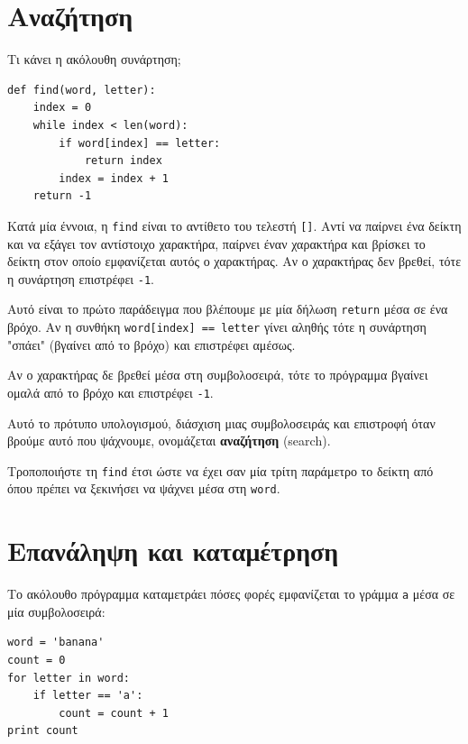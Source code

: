 \documentclass[10pt]{book}
\begin{document}
\section{Αναζήτηση}
\label{find}

Τι κάνει η ακόλουθη συνάρτηση;

\begin{verbatim}
def find(word, letter):
    index = 0
    while index < len(word):
        if word[index] == letter:
            return index
        index = index + 1
    return -1
\end{verbatim}
%

Κατά μία έννοια, η {\tt find} είναι το αντίθετο του τελεστή {\tt []}. 
Αντί να παίρνει ένα δείκτη και να εξάγει τον αντίστοιχο χαρακτήρα, παίρνει έναν χαρακτήρα και βρίσκει το δείκτη στον οποίο εμφανίζεται αυτός ο χαρακτήρας. Αν ο χαρακτήρας δεν βρεθεί, τότε η συνάρτηση επιστρέφει {\tt -1}.

Αυτό είναι το πρώτο παράδειγμα που βλέπουμε με μία δήλωση {\tt return} μέσα σε ένα βρόχο. Αν η συνθήκη {\tt word[index] == letter} γίνει αληθής τότε η συνάρτηση "σπάει" (βγαίνει από το βρόχο) και επιστρέφει αμέσως.

Αν ο χαρακτήρας δε βρεθεί μέσα στη συμβολοσειρά, τότε το πρόγραμμα βγαίνει ομαλά από το βρόχο και επιστρέφει {\tt -1}.

Αυτό το πρότυπο υπολογισμού, διάσχιση μιας συμβολοσειράς και επιστροφή όταν βρούμε αυτό που ψάχνουμε, ονομάζεται {\bf αναζήτηση} (search).
\\

\begin{exercise}

Τροποποιήστε τη {\tt find} έτσι ώστε να έχει σαν μία τρίτη παράμετρο 
το δείκτη από όπου πρέπει να ξεκινήσει να ψάχνει μέσα στη {\tt word}.
\end{exercise}


\section{Επανάληψη και καταμέτρηση}
\label{counter}

Το ακόλουθο πρόγραμμα καταμετράει πόσες φορές εμφανίζεται το γράμμα {\tt a}
μέσα σε μία συμβολοσειρά:

\begin{verbatim}
word = 'banana'
count = 0
for letter in word:
    if letter == 'a':
        count = count + 1
print count
\end{verbatim}
%
\end{document}
